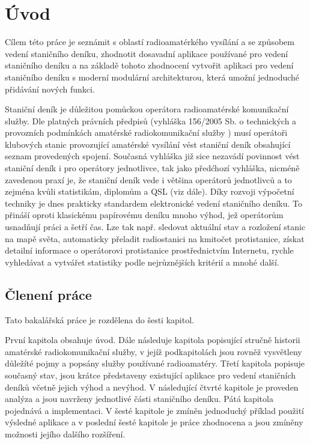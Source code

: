 \chapter{Úvod}
\label{uvod}

Cílem této práce je seznámit s oblastí radioamatérkého vysílání a se způsobem vedení staničního deníku,
zhodnotit dosavadní aplikace používané pro vedení staničního deníku a 
na základě tohoto zhodnocení vytvořit aplikaci pro vedení staničního deníku s moderní modulární architekturou,
která umožní jednoduché přidávání nových funkci.

Staniční deník je důležitou pomůckou operátora radioamatérské komunikační
služby. Dle platných právních předpisů (vyhláška 156/2005 Sb. o technických a
provozních podmínkách amatérské radiokomunikační služby \cite{vyhlaska})
musí operátoři klubových stanic provozující amatérské vysílání
vést staniční deník obsahující seznam provedených spojení.
Současná vyhláška již sice nezavádí povinnost vést staniční deník i pro
operátory jednotlivce, tak jako předćhozí vyhláška, 
nicméně zavedenou praxí je, že staniční deník vede i většina operátorů
jednotlivců a to zejména kvůli statistikám, diplomům a QSL (viz dále).
Díky rozvoji výpočetní techniky je dnes prakticky standardem
elektronické vedení staničního deníku.
To přináší oproti klasickému papírovému deníku mnoho výhod, jež
operátorům usnadňují práci a šetří čas. Lze tak např. sledovat aktuální stav a
rozložení stanic na mapě světa, automaticky přeladit radiostanici na kmitočet
protistanice, získat detailní informace o operátorovi protistanice
prostřednictvím Internetu, rychle vyhledávat a vytvářet statistiky podle nejrůznějších kritérií a
mnohé další.

\section{Členení práce}

Tato bakalářská  práce je rozdělena do šesti kapitol.

První kapitola obsahuje úvod. Dále následuje kapitola popisující stručně historii amatérské radiokomunikační služby,
v jejíž podkapitolách jsou rovněž vysvětleny důležíté pojmy a popsány služby používané radioamatéry.
Třetí kapitola popisuje současný stav, jsou krátce představeny existující
aplikace pro vedení staničních deníků včetně jejich výhod a nevýhod. V
následující čtvrté kapitole je proveden analýza a jsou navrženy jednotlivé části staničního deníku.
Pátá kapitola pojednává a implementaci. V šesté kapitole je zmíněn jednoduchý příklad použití výsledné aplikace
 a v poslední šesté kapitole je práce zhodnocena a jsou zmíněny možnosti jejího
 dalšího rozšíření.


